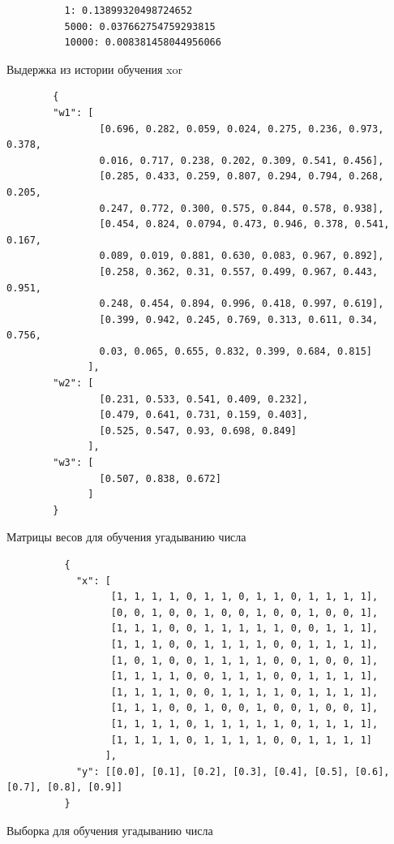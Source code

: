 \documentclass[bachelor, och, pract_otchet]{SCWorks}
\begin{document}
      \begin{listing}[H]
        \begin{verbatim}
          1: 0.13899320498724652
          5000: 0.037662754759293815
          10000: 0.008381458044956066
        \end{verbatim}
        \caption{Выдержка из истории обучения xor}
      \end{listing}

      \begin{listing}[H]
        \begin{verbatim}
        {
        "w1": [
                [0.696, 0.282, 0.059, 0.024, 0.275, 0.236, 0.973, 0.378, 
                0.016, 0.717, 0.238, 0.202, 0.309, 0.541, 0.456],
                [0.285, 0.433, 0.259, 0.807, 0.294, 0.794, 0.268, 0.205, 
                0.247, 0.772, 0.300, 0.575, 0.844, 0.578, 0.938],
                [0.454, 0.824, 0.0794, 0.473, 0.946, 0.378, 0.541, 0.167, 
                0.089, 0.019, 0.881, 0.630, 0.083, 0.967, 0.892],
                [0.258, 0.362, 0.31, 0.557, 0.499, 0.967, 0.443, 0.951, 
                0.248, 0.454, 0.894, 0.996, 0.418, 0.997, 0.619],
                [0.399, 0.942, 0.245, 0.769, 0.313, 0.611, 0.34, 0.756, 
                0.03, 0.065, 0.655, 0.832, 0.399, 0.684, 0.815]
              ],
        "w2": [
                [0.231, 0.533, 0.541, 0.409, 0.232],
                [0.479, 0.641, 0.731, 0.159, 0.403],
                [0.525, 0.547, 0.93, 0.698, 0.849]
              ],
        "w3": [
                [0.507, 0.838, 0.672]
              ]
        }
        \end{verbatim}
        \caption{Матрицы весов для обучения угадыванию числа}
      \end{listing}

      \begin{listing}[H]
        \begin{verbatim}
          {
            "x": [
                  [1, 1, 1, 1, 0, 1, 1, 0, 1, 1, 0, 1, 1, 1, 1],
                  [0, 0, 1, 0, 0, 1, 0, 0, 1, 0, 0, 1, 0, 0, 1],
                  [1, 1, 1, 0, 0, 1, 1, 1, 1, 1, 0, 0, 1, 1, 1],
                  [1, 1, 1, 0, 0, 1, 1, 1, 1, 0, 0, 1, 1, 1, 1],
                  [1, 0, 1, 0, 0, 1, 1, 1, 1, 0, 0, 1, 0, 0, 1],
                  [1, 1, 1, 1, 0, 0, 1, 1, 1, 0, 0, 1, 1, 1, 1],
                  [1, 1, 1, 1, 0, 0, 1, 1, 1, 1, 0, 1, 1, 1, 1],
                  [1, 1, 1, 0, 0, 1, 0, 0, 1, 0, 0, 1, 0, 0, 1],
                  [1, 1, 1, 1, 0, 1, 1, 1, 1, 1, 0, 1, 1, 1, 1],
                  [1, 1, 1, 1, 0, 1, 1, 1, 1, 0, 0, 1, 1, 1, 1]
                 ],
            "y": [[0.0], [0.1], [0.2], [0.3], [0.4], [0.5], [0.6], [0.7], [0.8], [0.9]]
          }
        \end{verbatim}
        \caption{Выборка для обучения угадыванию числа}
      \end{listing}
\end{document}
